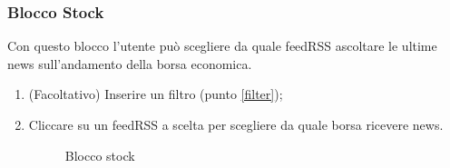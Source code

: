 \subsubsection{Blocco Stock}
Con questo blocco l'utente può scegliere da quale feedRSS ascoltare le ultime news sull'andamento della borsa economica.
\begin{enumerate}
	\item (Facoltativo) Inserire un filtro (punto \ref{filter});
	\item Cliccare su un feedRSS a scelta per scegliere da quale borsa ricevere news.
	\begin{figure}[!ht]
		\centering
		\caption{Blocco stock}
	\end{figure}
\end{enumerate}
\newpage
